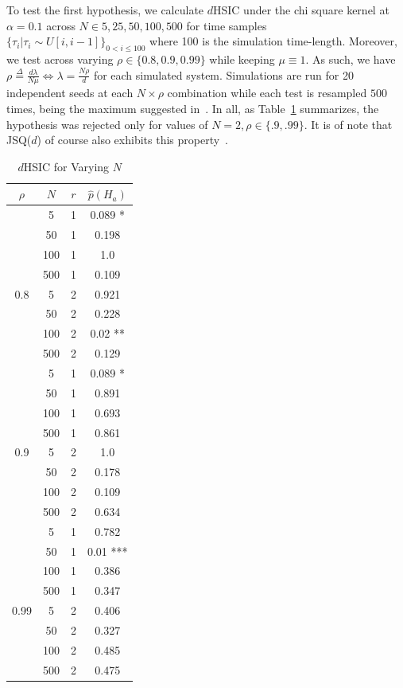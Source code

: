 To test the first hypothesis, we calculate $d$HSIC under the chi square kernel at $\alpha = 0.1$ across $N \in {5, 25, 50, 100, 500}$
for time samples $\{\tau_{i} | \tau_{i} \sim U[i,i-1]\}_{0 < i \leq 100}$ where 100 is the simulation time-length.
Moreover, we test across varying $\rho \in \{0.8, 0.9, 0.99\}$ while keeping $\mu \equiv 1$.
As such, we have $\rho \overset{\Delta}= \frac{d\lambda}{N\mu} \iff \lambda = \frac{N \rho}{d}$ for each simulated system.
Simulations are run for 20 independent seeds at each $N\times\rho$ combination while each test is resampled $500$ times, being the maximum suggested in~\cite{jointindep}.
In all, as Table~\ref{tab:reg} summarizes, the hypothesis was rejected only for values of $N = 2, \rho \in \{.9,.99\}$.
It is of note that JSQ($d$) of course also exhibits this property~\cite{bramson_asymptotic_2012}.
\begin{table}
    \centering
    \caption{$d$HSIC for Varying $N$}
    \label{tab:reg}
    \begin{tabular}{|c|c|c|c|}
        \hline
        $\rho$ & $N$ & $r$ & $\hat p(H_{a})$ \\
        \hline
        \hline
        & 5   & 1   & 0.089 *         \\
        & 50  & 1   & 0.198           \\
        & 100 & 1   & 1.0             \\
        & 500 & 1   & 0.109           \\
        0.8    & 5   & 2   & 0.921           \\
        & 50  & 2   & 0.228           \\
        & 100 & 2   & 0.02 **         \\
        & 500 & 2   & 0.129           \\
        \hline
        & 5   & 1   & 0.089 *         \\
        & 50  & 1   & 0.891           \\
        & 100 & 1   & 0.693           \\
        & 500 & 1   & 0.861           \\
        0.9    & 5   & 2   & 1.0             \\
        & 50  & 2   & 0.178           \\
        & 100 & 2   & 0.109           \\
        & 500 & 2   & 0.634           \\
        \hline

        & 5   & 1   & 0.782           \\
        & 50  & 1   & 0.01 ***        \\
        & 100 & 1   & 0.386           \\
        & 500 & 1   & 0.347           \\
        0.99   & 5   & 2   & 0.406           \\
        & 50  & 2   & 0.327           \\
        & 100 & 2   & 0.485           \\
        & 500 & 2   & 0.475           \\
        \hline



\end{tabular}
\end{table}
